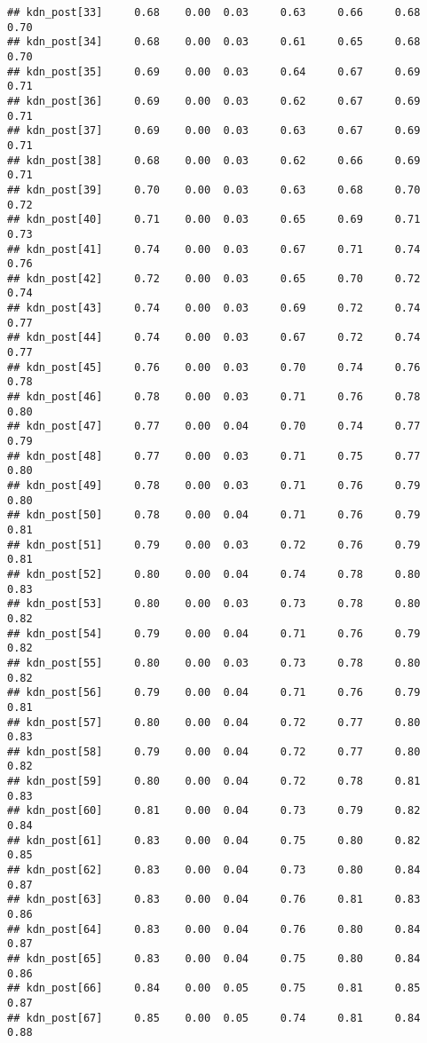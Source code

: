 \documentclass{article}\usepackage[]{graphicx}\usepackage[]{color}
\makeatletter
\newenvironment{kframe}{%
 \def\at@end@of@kframe{}%
 \ifinner\ifhmode%
  \def\at@end@of@kframe{\end{minipage}}%
  \begin{minipage}{\columnwidth}%
 \fi\fi%
 \def\FrameCommand##1{\hskip\@totalleftmargin \hskip-\fboxsep
 \colorbox{shadecolor}{##1}\hskip-\fboxsep
     \hskip-\linewidth \hskip-\@totalleftmargin \hskip\columnwidth}%
 \MakeFramed {\advance\hsize-\width
   \@totalleftmargin\z@ \linewidth\hsize
   \@setminipage}}%
 {\par\unskip\endMakeFramed%
 \at@end@of@kframe}
\newenvironment{knitrout}{}{} %
\makeatother
\begin{document}
\begin{knitrout}
\begin{kframe}
\begin{verbatim}
## kdn_post[33]     0.68    0.00  0.03     0.63     0.66     0.68     0.70
## kdn_post[34]     0.68    0.00  0.03     0.61     0.65     0.68     0.70
## kdn_post[35]     0.69    0.00  0.03     0.64     0.67     0.69     0.71
## kdn_post[36]     0.69    0.00  0.03     0.62     0.67     0.69     0.71
## kdn_post[37]     0.69    0.00  0.03     0.63     0.67     0.69     0.71
## kdn_post[38]     0.68    0.00  0.03     0.62     0.66     0.69     0.71
## kdn_post[39]     0.70    0.00  0.03     0.63     0.68     0.70     0.72
## kdn_post[40]     0.71    0.00  0.03     0.65     0.69     0.71     0.73
## kdn_post[41]     0.74    0.00  0.03     0.67     0.71     0.74     0.76
## kdn_post[42]     0.72    0.00  0.03     0.65     0.70     0.72     0.74
## kdn_post[43]     0.74    0.00  0.03     0.69     0.72     0.74     0.77
## kdn_post[44]     0.74    0.00  0.03     0.67     0.72     0.74     0.77
## kdn_post[45]     0.76    0.00  0.03     0.70     0.74     0.76     0.78
## kdn_post[46]     0.78    0.00  0.03     0.71     0.76     0.78     0.80
## kdn_post[47]     0.77    0.00  0.04     0.70     0.74     0.77     0.79
## kdn_post[48]     0.77    0.00  0.03     0.71     0.75     0.77     0.80
## kdn_post[49]     0.78    0.00  0.03     0.71     0.76     0.79     0.80
## kdn_post[50]     0.78    0.00  0.04     0.71     0.76     0.79     0.81
## kdn_post[51]     0.79    0.00  0.03     0.72     0.76     0.79     0.81
## kdn_post[52]     0.80    0.00  0.04     0.74     0.78     0.80     0.83
## kdn_post[53]     0.80    0.00  0.03     0.73     0.78     0.80     0.82
## kdn_post[54]     0.79    0.00  0.04     0.71     0.76     0.79     0.82
## kdn_post[55]     0.80    0.00  0.03     0.73     0.78     0.80     0.82
## kdn_post[56]     0.79    0.00  0.04     0.71     0.76     0.79     0.81
## kdn_post[57]     0.80    0.00  0.04     0.72     0.77     0.80     0.83
## kdn_post[58]     0.79    0.00  0.04     0.72     0.77     0.80     0.82
## kdn_post[59]     0.80    0.00  0.04     0.72     0.78     0.81     0.83
## kdn_post[60]     0.81    0.00  0.04     0.73     0.79     0.82     0.84
## kdn_post[61]     0.83    0.00  0.04     0.75     0.80     0.82     0.85
## kdn_post[62]     0.83    0.00  0.04     0.73     0.80     0.84     0.87
## kdn_post[63]     0.83    0.00  0.04     0.76     0.81     0.83     0.86
## kdn_post[64]     0.83    0.00  0.04     0.76     0.80     0.84     0.87
## kdn_post[65]     0.83    0.00  0.04     0.75     0.80     0.84     0.86
## kdn_post[66]     0.84    0.00  0.05     0.75     0.81     0.85     0.87
## kdn_post[67]     0.85    0.00  0.05     0.74     0.81     0.84     0.88

\end{verbatim}
\end{kframe}
\end{knitrout}
\end{document}
